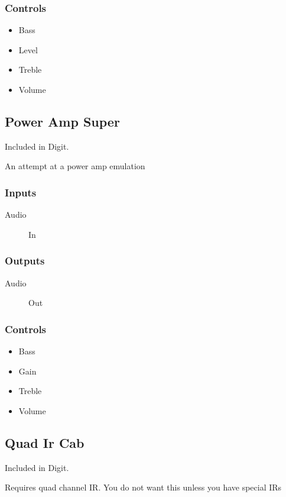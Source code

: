 \subsubsection{Controls}
\begin{itemize}
\item Bass
\item Level
\item Treble
\item Volume
\end{itemize}

\subsection{Power Amp Super}

Included in Digit.

An attempt at a power amp emulation



\subsubsection{Inputs}
\begin{description}
\item [Audio] In
\end{description}

\subsubsection{Outputs}
\begin{description}
\item [Audio] Out
\end{description}

\subsubsection{Controls}
\begin{itemize}
\item Bass
\item Gain
\item Treble
\item Volume
\end{itemize}

\subsection{Quad Ir Cab}

Included in Digit.

Requires quad channel IR. You do not want this unless you have special IRs



